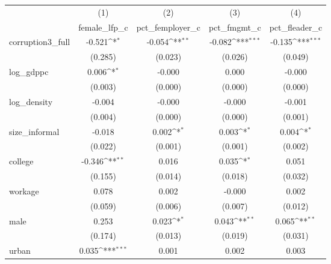 {
\def\sym#1{\ifmmode^{#1}\else\(^{#1}\)\fi}
\begin{tabular}{l*{4}{c}}
\hline\hline
            &\multicolumn{1}{c}{(1)}&\multicolumn{1}{c}{(2)}&\multicolumn{1}{c}{(3)}&\multicolumn{1}{c}{(4)}\\
            &\multicolumn{1}{c}{female\_lfp\_c}&\multicolumn{1}{c}{pct\_femployer\_c}&\multicolumn{1}{c}{pct\_fmgmt\_c}&\multicolumn{1}{c}{pct\_fleader\_c}\\
\hline
corruption3\_full&      -0.521\sym{*}  &      -0.054\sym{**} &      -0.082\sym{***}&      -0.135\sym{***}\\
            &     (0.285)         &     (0.023)         &     (0.026)         &     (0.049)         \\
[1em]
log\_gdppc   &       0.006\sym{*}  &      -0.000         &       0.000         &      -0.000         \\
            &     (0.003)         &     (0.000)         &     (0.000)         &     (0.000)         \\
[1em]
log\_density &      -0.004         &      -0.000         &      -0.000         &      -0.001         \\
            &     (0.004)         &     (0.000)         &     (0.000)         &     (0.001)         \\
[1em]
size\_informal&      -0.018         &       0.002\sym{*}  &       0.003\sym{*}  &       0.004\sym{*}  \\
            &     (0.022)         &     (0.001)         &     (0.001)         &     (0.002)         \\
[1em]
college     &      -0.346\sym{**} &       0.016         &       0.035\sym{*}  &       0.051         \\
            &     (0.155)         &     (0.014)         &     (0.018)         &     (0.032)         \\
[1em]
workage     &       0.078         &       0.002         &      -0.000         &       0.002         \\
            &     (0.059)         &     (0.006)         &     (0.007)         &     (0.012)         \\
[1em]
male        &       0.253         &       0.023\sym{*}  &       0.043\sym{**} &       0.065\sym{**} \\
            &     (0.174)         &     (0.013)         &     (0.019)         &     (0.031)         \\
[1em]
urban       &       0.035\sym{***}&       0.001         &       0.002         &       0.003         \\

\end{tabular}}
